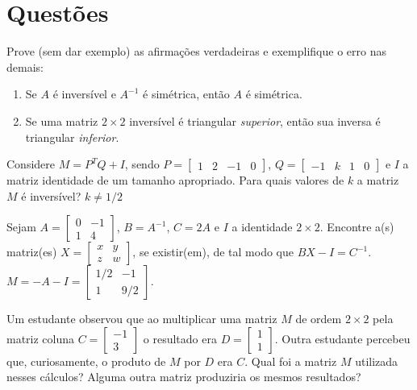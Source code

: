 \documentclass[12pt,a4paper]{article}
\newcommand{\fixme}{{\color{red}(...)}}
\begin{document}
\section*{Questões}
\begin{ExerciseList}

\Exercise[title={2,5}] Prove (sem dar exemplo) as afirmações verdadeiras e exemplifique o erro nas demais:
\begin{enumerate}
\item Se $A$ é inversível e $A^{-1}$ é simétrica, então $A$ é simétrica.
\item Se uma matriz $2 \times 2$ inversível é triangular \textit{superior}, então sua inversa é triangular \textit{inferior}.
\end{enumerate}
\Answer \fixme

\Exercise[title={2,5}] Considere $M = P^T Q + I$, sendo $P = \begin{bmatrix}
1 & 2 & -1 & 0
\end{bmatrix}$, $Q = \begin{bmatrix}
-1 & k & 1 & 0
\end{bmatrix}$ e $I$ a matriz identidade de um tamanho apropriado. Para quais valores de $k$ a matriz $M$ é inversível?
\Answer $k \neq 1/2$

\Exercise[title={2,5}] Sejam $
A =
\begin{bmatrix}
0 & -1 \\
1 & 4
\end{bmatrix}
$, $B = A^{-1}$, $C = 2A$ e $I$ a identidade $2 \times 2$. Encontre a(s) matriz(es) $
X =
\begin{bmatrix}
x & y \\
z & w
\end{bmatrix}
$, se existir(em), de tal modo que $BX - I = C^{-1}$.
\Answer $M = -A - I =
\begin{bmatrix}
1/2 & -1 \\
1 & 9/2
\end{bmatrix}$.

\Exercise[title={2,5}] Um estudante observou que ao multiplicar uma matriz $M$ de ordem $2\times 2$ pela matriz coluna $C =
\begin{bmatrix}
-1\\3
\end{bmatrix}
$ o resultado era $D =
\begin{bmatrix}
1\\1
\end{bmatrix}
$. Outra estudante percebeu que, curiosamente, o produto de $M$ por $D$ era $C$. Qual foi a matriz $M$ utilizada nesses cálculos? Alguma outra matriz produziria os mesmos resultados?



\end{ExerciseList}
\end{document}
